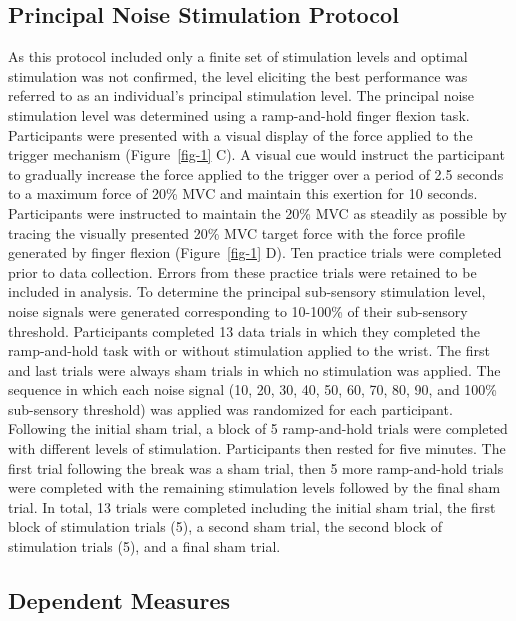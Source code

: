 \documentclass[]{cik}%
\begin{document}
\hypertarget{principal-noise-stimulation-protocol}{%
\subsection{Principal Noise Stimulation
Protocol}\label{principal-noise-stimulation-protocol}}

As this protocol included only a finite set of stimulation levels and
optimal stimulation was not confirmed, the level eliciting the best
performance was referred to as an individual's principal stimulation
level. The principal noise stimulation level was determined using a
ramp-and-hold finger flexion task. Participants were presented with a
visual display of the force applied to the trigger mechanism
(Figure~\ref{fig-1} C). A visual cue would instruct the participant to
gradually increase the force applied to the trigger over a period of 2.5
seconds to a maximum force of 20\% MVC and maintain this exertion for 10
seconds. Participants were instructed to maintain the 20\% MVC as
steadily as possible by tracing the visually presented 20\% MVC target
force with the force profile generated by finger flexion
(Figure~\ref{fig-1} D). Ten practice trials were completed prior to data
collection. Errors from these practice trials were retained to be
included in analysis. To determine the principal sub-sensory stimulation
level, noise signals were generated corresponding to 10-100\% of their
sub-sensory threshold. Participants completed 13 data trials in which
they completed the ramp-and-hold task with or without stimulation
applied to the wrist. The first and last trials were always sham trials
in which no stimulation was applied. The sequence in which each noise
signal (10, 20, 30, 40, 50, 60, 70, 80, 90, and 100\% sub-sensory
threshold) was applied was randomized for each participant. Following
the initial sham trial, a block of 5 ramp-and-hold trials were completed
with different levels of stimulation. Participants then rested for five
minutes. The first trial following the break was a sham trial, then 5
more ramp-and-hold trials were completed with the remaining stimulation
levels followed by the final sham trial. In total, 13 trials were
completed including the initial sham trial, the first block of
stimulation trials (5), a second sham trial, the second block of
stimulation trials (5), and a final sham trial.

\hypertarget{dependent-measures}{%
\subsection{Dependent Measures}\label{dependent-measures}}
\end{document}
